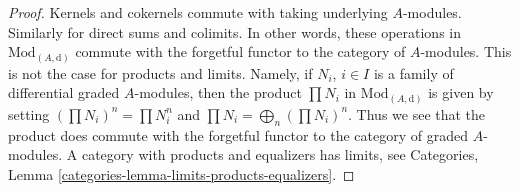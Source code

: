 \documentclass[10pt,a4paper]{amsart}
\theoremstyle{plain}
\theoremstyle{definition}
\theoremstyle{remark}
\numberwithin{equation}{subsection}
\begin{document}
\begin{proof}
Kernels and cokernels commute with taking underlying $A$-modules.
Similarly for direct sums and colimits. In other words, these operations
in $\text{Mod}_{(A, \text{d})}$ commute with the forgetful functor to the
category of $A$-modules. This is not the case for products and limits.
Namely, if $N_i$, $i \in I$ is a family of
differential graded $A$-modules, then the product $\prod N_i$ in
$\text{Mod}_{(A, \text{d})}$ is given by setting $(\prod N_i)^n = \prod N_i^n$
and $\prod N_i = \bigoplus_n (\prod N_i)^n$. Thus we see that the product
does commute with the forgetful functor to the category of graded $A$-modules.
A category with products and equalizers has limits, see
Categories, Lemma \ref{categories-lemma-limits-products-equalizers}.
\end{proof}
\end{document}
